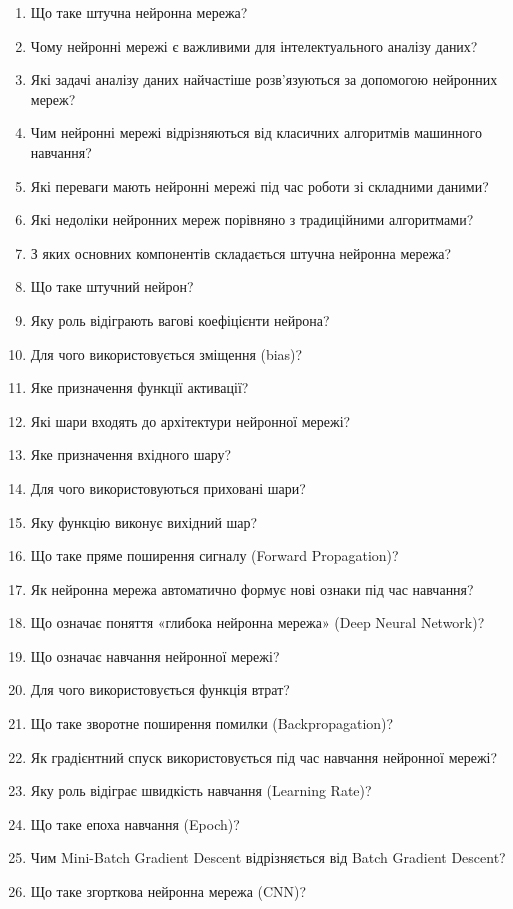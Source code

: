 \begin{enumerate}
\item Що таке штучна нейронна мережа?
\item Чому нейронні мережі є важливими для інтелектуального аналізу даних?
\item Які задачі аналізу даних найчастіше розв'язуються за допомогою нейронних мереж?
\item Чим нейронні мережі відрізняються від класичних алгоритмів машинного навчання?
\item Які переваги мають нейронні мережі під час роботи зі складними даними?
\item Які недоліки нейронних мереж порівняно з традиційними алгоритмами?
\item З яких основних компонентів складається штучна нейронна мережа?
\item Що таке штучний нейрон?
\item Яку роль відіграють вагові коефіцієнти нейрона?
\item Для чого використовується зміщення (bias)?
\item Яке призначення функції активації?
\item Які шари входять до архітектури нейронної мережі?
\item Яке призначення вхідного шару?
\item Для чого використовуються приховані шари?
\item Яку функцію виконує вихідний шар?
\item Що таке пряме поширення сигналу (Forward Propagation)?
\item Як нейронна мережа автоматично формує нові ознаки під час навчання?
\item Що означає поняття «глибока нейронна мережа» (Deep Neural Network)?
\item Що означає навчання нейронної мережі?
\item Для чого використовується функція втрат?
\item Що таке зворотне поширення помилки (Backpropagation)?
\item Як градієнтний спуск використовується під час навчання нейронної мережі?
\item Яку роль відіграє швидкість навчання (Learning Rate)?
\item Що таке епоха навчання (Epoch)?
\item Чим Mini-Batch Gradient Descent відрізняється від Batch Gradient Descent?
\item Що таке згорткова нейронна мережа (CNN)?

\end{enumerate}
